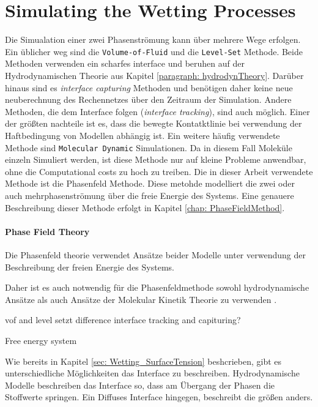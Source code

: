 \section{Simulating the Wetting Processes}
Die Simualation einer zwei Phasenströmung kann über mehrere Wege erfolgen. Ein üblicher weg sind die \texttt{Volume-of-Fluid} und die \texttt{Level-Set} Methode. Beide Methoden verwenden ein scharfes interface und beruhen auf der Hydrodynamischen Theorie aus Kapitel \ref{paragraph: hydrodynTheory}. Darüber hinaus sind es \textit{interface capturing} Methoden und benötigen daher keine neue neuberechnung des Rechennetzes über den Zeitraum der Simulation. Andere Methoden, die dem Interface folgen (\textit{interface tracking}), sind auch möglich. Einer der größten nachteile ist es, dass die bewegte Kontatktlinie bei verwendung der Haftbedingung von Modellen abhängig ist\cite{carlsonCapillarityDynamicWetting2012}. 
Ein weitere häufig verwendete Methode sind \texttt{Molecular Dynamic} Simulationen. Da in diesem Fall Moleküle einzeln Simuliert werden, ist diese Methode nur auf kleine Probleme anwendbar, ohne die Computational costs zu hoch zu treiben. 
Die in dieser Arbeit verwendete Methode ist die Phasenfeld Methode. Diese metohde modelliert die zwei oder auch mehrphasenströmung über die freie Energie des Systems. Eine genauere Beschreibung dieser Methode erfolgt in Kapitel \ref{chap: PhaseFieldMethod}. 



\paragraph{Phase Field Theory}
Die Phasenfeld theorie verwendet Ansätze beider Modelle unter verwendung der Beschreibung der freien Energie des Systems.

Daher ist es auch notwendig für die Phasenfeldmethode sowohl hydrodynamische Ansätze als auch Ansätze der Molekular Kinetik Theorie zu verwenden \cite{blake2006PhysicsMovingWetting, carlsonCapillarityDynamicWetting2012}.

vof and level setzt
difference interface tracking and capituring? 

Free energy system 





Wie bereits in Kapitel \ref{sec: Wetting_SurfaceTension} beshcrieben, gibt es unterschiedliche Möglichkeiten das Interface zu beschreiben. Hydrodynamische Modelle beschreiben das Interface so, dass am Übergang der Phasen die Stoffwerte springen. Ein Diffuses Interface hingegen, beschreibt die größen anders. 

